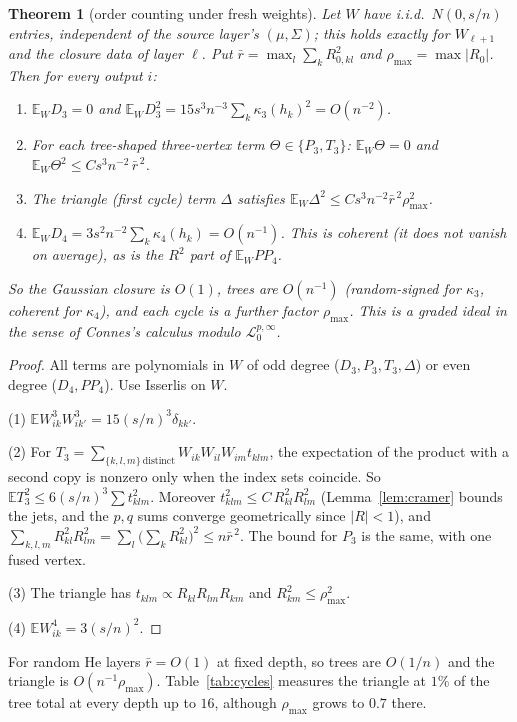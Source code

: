 \documentclass[11pt]{article}
\newtheorem{theorem}{Theorem}[section]
\theoremstyle{definition}
\theoremstyle{remark}
\newcommand{\E}{\mathbb E}
\begin{document}
\begin{theorem}[order counting under fresh weights]\label{thm:orders}
Let $W$ have i.i.d.\ $N(0,s/n)$ entries, independent of the source layer's $(\mu,\Sigma)$; this holds exactly for $W_{\ell+1}$ and the closure data of layer $\ell$. Put $\bar r=\max_l\sum_{k}R_{0,kl}^2$ and $\rho_{\max}=\max|R_0|$. Then for every output $i$:
\begin{enumerate}
\item $\E_W D_3=0$ and $\E_WD_3^2=15s^3n^{-3}\sum_k\kappa_3(h_k)^2=O(n^{-2})$.
\item For each tree-shaped three-vertex term $\Theta\in\{P_3,T_3\}$: $\E_W\Theta=0$ and $\E_W\Theta^2\le C s^3n^{-2}\,\bar r^{\,2}$.
\item The triangle (first cycle) term $\Delta$ satisfies $\E_W\Delta^2\le Cs^3n^{-2}\bar r^{\,2}\rho_{\max}^2$.
\item $\E_WD_4=3s^2n^{-2}\sum_k\kappa_4(h_k)=O(n^{-1})$. This is coherent (it does not vanish on average), as is the $R^2$ part of $\E_WPP_4$.
\end{enumerate}
So the Gaussian closure is $O(1)$, trees are $O(n^{-1})$ (random-signed for $\kappa_3$, coherent for $\kappa_4$), and each cycle is a further factor $\rho_{\max}$. This is a graded ideal in the sense of Connes's calculus modulo $\mathcal L^{p,\infty}_0$.
\end{theorem}

\begin{proof}
All terms are polynomials in $W$ of odd degree ($D_3,P_3,T_3,\Delta$) or even degree ($D_4,PP_4$). Use Isserlis on $W$.

(1) $\E W_{ik}^3W_{ik'}^3=15(s/n)^3\delta_{kk'}$.

(2) For $T_3=\sum_{\{k,l,m\}\ \mathrm{distinct}}W_{ik}W_{il}W_{im}t_{klm}$, the expectation of the product with a second copy is nonzero only when the index sets coincide. So $\E T_3^2\le6(s/n)^3\sum t_{klm}^2$. Moreover $t_{klm}^2\le C\,R_{kl}^2R_{lm}^2$ (Lemma~\ref{lem:cramer} bounds the jets, and the $p,q$ sums converge geometrically since $|R|<1$), and $\sum_{k,l,m}R_{kl}^2R_{lm}^2=\sum_l\big(\sum_kR_{kl}^2\big)^2\le n\bar r^{\,2}$. The bound for $P_3$ is the same, with one fused vertex.

(3) The triangle has $t_{klm}\propto R_{kl}R_{lm}R_{km}$ and $R_{km}^2\le\rho_{\max}^2$.

(4) $\E W_{ik}^4=3(s/n)^2$.
\end{proof}

\noindent For random He layers $\bar r=O(1)$ at fixed depth, so trees are $O(1/n)$ and the triangle is $O(n^{-1}\rho_{\max})$. Table~\ref{tab:cycles} measures the triangle at $1\%$ of the tree total at every depth up to $16$, although $\rho_{\max}$ grows to $0.7$ there.
\end{document}
